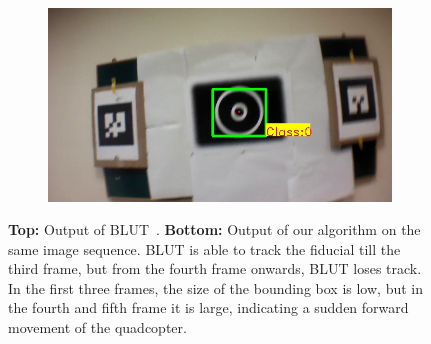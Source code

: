 \documentclass[10pt,twocolumn,letterpaper]{article}
\begin{document}
\begin{figure}
\begin{subfigure}[b]{.19\textwidth}
\end{subfigure}
\begin{subfigure}[b]{.19\textwidth}
\includegraphics[width=\linewidth]{images/BLUT_input_00/output6.jpg}
\end{subfigure}
\caption{\textbf{Top:} Output of BLUT~\cite{Wu:2011}. \textbf{Bottom:}
  Output of our algorithm on the same image 
  sequence. BLUT is able to track the fiducial till the third frame,
  but from the fourth frame onwards, BLUT loses track. In the first
  three frames, the size of the  bounding box is low, but in the fourth
  and fifth frame it is large, indicating a sudden forward movement
  of the quadcopter.} 
\label{fig:BLUT_compare_00}
\end{figure}
\end{document}
